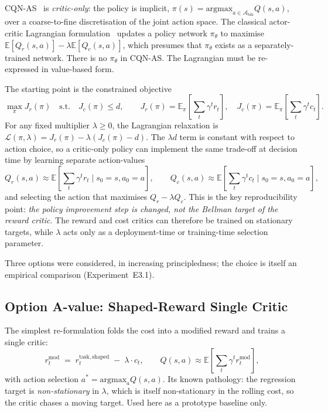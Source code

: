 \documentclass[11pt,a4paper]{report}
\newcommand{\cqnas}{CQN-AS}
\begin{document}
\cqnas{}~\cite{seo2024cqnas} is \emph{critic-only}: the policy is
implicit, $\pi(s) = \mathrm{argmax}_{a \in
\mathcal{A}_{\mathrm{bin}}} Q(s, a)$, over a coarse-to-fine
discretisation of the joint action space. The classical
actor-critic Lagrangian formulation~\cite{ray2019safetygym,
stooke2020pid} updates a policy network $\pi_\theta$ to maximise
$\mathbb{E}[Q_r(s,a)] - \lambda \mathbb{E}[Q_c(s,a)]$, which
presumes that $\pi_\theta$ exists as a separately-trained network.
There is no $\pi_\theta$ in \cqnas{}. The Lagrangian must be
re-expressed in value-based form.

The starting point is the constrained objective
\begin{equation}
  \max_{\pi} J_r(\pi)
  \quad \text{s.t.} \quad
  J_c(\pi) \le d,
  \qquad
  J_r(\pi)=\mathbb{E}_{\pi}\!\left[\sum_t \gamma^t r_t\right],
  \quad
  J_c(\pi)=\mathbb{E}_{\pi}\!\left[\sum_t \gamma^t c_t\right].
  \label{eq:cmdp-objective}
\end{equation}
For any fixed multiplier $\lambda \ge 0$, the Lagrangian relaxation is
$\mathcal{L}(\pi,\lambda)=J_r(\pi)-\lambda(J_c(\pi)-d)$. The
$\lambda d$ term is constant with respect to action choice, so a
critic-only policy can implement the same trade-off at decision time
by learning separate action-values
\[
Q_r(s,a)\approx\mathbb{E}\!\left[\sum_t\gamma^t r_t\mid s_0=s,a_0=a\right],
\qquad
Q_c(s,a)\approx\mathbb{E}\!\left[\sum_t\gamma^t c_t\mid s_0=s,a_0=a\right],
\]
and selecting the action that maximises $Q_r-\lambda Q_c$. This is the
key reproducibility point: \emph{the policy improvement step is changed,
not the Bellman target of the reward critic}. The reward and cost
critics can therefore be trained on stationary targets, while
$\lambda$ acts only as a deployment-time or training-time selection
parameter.

Three options were considered, in increasing principledness; the
choice is itself an empirical comparison
(Experiment~E3.1).

\subsection{Option A-value: Shaped-Reward Single Critic}
\label{sec:method:lagrangian:A}

The simplest re-formulation folds the cost into a modified reward
and trains a single critic:
\begin{equation}
  r^{\mathrm{mod}}_t \;=\; r^{\mathrm{task,shaped}}_t \;-\; \lambda \cdot c_t,
  \qquad
  Q(s,a) \approx \mathbb{E}\!\left[\sum_t \gamma^t r^{\mathrm{mod}}_t\right],
  \label{eq:option-A}
\end{equation}
with action selection $a^* = \mathrm{argmax}_a Q(s,a)$. Its known
pathology: the regression target is \emph{non-stationary} in
$\lambda$, which is itself non-stationary in the rolling cost, so
the critic chases a moving target. Used here as a prototype baseline
only.
\end{document}
